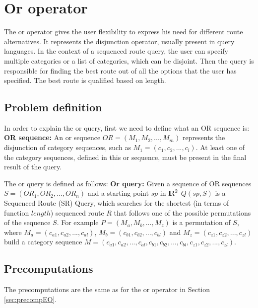 

\section{Or operator}
The or operator gives the user flexibility to express his need for different route alternatives. It represents the disjunction operator, usually present in query languages. In the context of a sequenced route query, the user can specify multiple categories or a list of categories, which can be disjoint. Then the query is responsible for finding the best route out of all the options that the user has specified. The best route is qualified based on length.

\subsection{Problem definition} 
\label{sec:problemOr}
In order to explain the or query, first we need to define what an OR sequence is:\newline
\textbf{OR sequence:} An or sequence $OR = (M_1, M_2, ..., M_m)$ represents the disjunction of category sequences, such as $M_1 = (c_1, c_2, ..., c_l)$. At least one of the category sequences, defined in this or sequence, must be present in the final result of the query.\newline

The or query is defined as follows: \newline
\textbf{Or query:} Given a sequence of OR sequences $S = (OR_1, OR_2, ..., OR_n)$ and a starting point $sp$ in ${\rm I\!R}^2$
$Q(sp, S)$ is a Sequenced Route (SR) Query, which searches for the shortest (in terms of function $length$) sequenced route $R$ that follows one of the possible permutations of the sequence $S$. 
For example $P = (M_a, M_b, ..., M_z)$ is a permutation of $S$, where $M_a = (c_{a1}, c_{a2}, ..., c_{al})$, $M_b = (c_{b1}, c_{b2}, ..., c_{bl})$ and $M_z = (c_{z1}, c_{z2}, ..., c_{zl})$ build a category sequence \newline
$M = (c_{a1}, c_{a2}, ..., c_{al}, c_{b1}, c_{b2}, ..., c_{bl}, c_{z1}, c_{z2}, ..., c_{zl})$.

\subsection{Precomputations} 
\label{sec:precompOr}
The precomputations are the same as for the or operator in Section \ref{sec:precompEO}.

